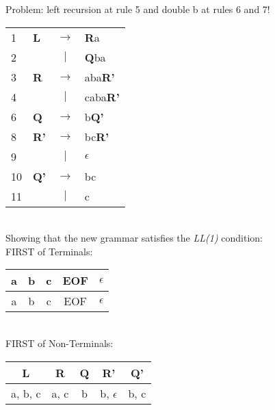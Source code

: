 \documentclass[11pt]{article} %
\begin{document}
\noindent Problem: left recursion at rule 5 and double b at rules 6 and 7!  \\

\begin{tabular}{llcl}
1
& \textbf{L}
& $\rightarrow$
& \textbf{R}a \\

2
& 
& $\vert$
& \textbf{Q}ba \\

3
& \textbf{R}
& $\rightarrow$
& aba\textbf{R'} \\

4
& 
& $\vert$
& caba\textbf{R'} \\

6
& \textbf{Q}
& $\rightarrow$
& b\textbf{Q'} \\

8
& \textbf{R'}
& $\rightarrow$
& bc\textbf{R'} \\

9
& 
& $\vert$
& $\epsilon$ \\

10
& \textbf{Q'}
& $\rightarrow$
& bc \\

11
& 
& $\vert$
& c \\
\end{tabular} \\

\noindent Showing that the new grammar satisfies the \textit{LL(1)} condition: \\

\noindent FIRST of Terminals: \\

\begin{tabular}{|c|c|c|c|c|} \hline 
\textbf{a}
& \textbf{b}
& \textbf{c}
& \textbf{EOF}
& \textbf{$\epsilon$}\\\hline 

a
& b
& c
& EOF
& $\epsilon$\\\hline  
\end{tabular} \\

\noindent FIRST of Non-Terminals: \\

\begin{tabular}{|c|c|c|c|c|} \hline 
\textbf{L}
& \textbf{R}
& \textbf{Q}
& \textbf{R'}
& \textbf{Q'} \\\hline 

a, b, c
& a, c
& b
& b, $\epsilon$
& b, c \\\hline  
\end{tabular} \\
\end{document}
